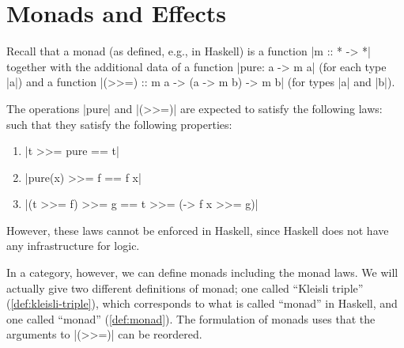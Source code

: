 
\section{Monads and Effects}
\label{sec:monads}
Recall that a monad (as defined, e.g., in Haskell) is a function |m :: * -> *| together with the additional data of a function |pure: a -> m a| (for each type |a|) and a function |(>>=) :: m a -> (a -> m b) -> m b| (for types |a| and |b|).

The operations |pure| and |(>>=)| are expected to satisfy the following laws:
such that they satisfy the following properties:
\begin{enumerate}
\item |t >>= pure == t| %
\item |pure(x) >>= f == f x| %
\item |(t >>= f) >>= g == t >>= (\x -> f x >>= g)|%
\end{enumerate}
However, these laws cannot be enforced in Haskell, since Haskell does not have any infrastructure for logic.

In a category, however, we can define monads including the monad laws.
We will actually give two different definitions of monad;
one called ``Kleisli triple'' (\cref{def:kleisli-triple}), which corresponds to what is called ``monad'' in Haskell,
and one called ``monad'' (\cref{def:monad}). 
The formulation of monads uses that the arguments to |(>>=)| can be reordered.

